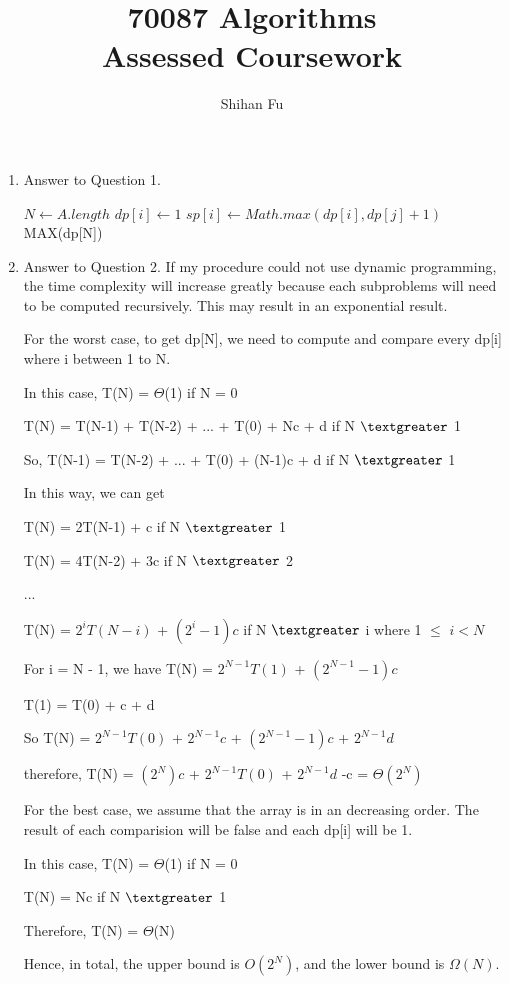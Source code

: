 \documentclass{article}
\title{
  70087 Algorithms \\
  Assessed Coursework
}
\author{Shihan Fu}
\begin{document}
\maketitle

\begin{enumerate}
  \item Answer to Question 1.
    \begin{algorithmic}[1]
      \Statex
        \State $N \gets A.length$
          \State $dp[i] \gets 1$
        \EndFor
              \State $sp[i] \gets Math.max(dp[i],dp[j]+1)$
            \EndIf
          \EndFor
        \EndFor
        \State \Return MAX(dp[N])
      \EndProcedure
    \end{algorithmic}
  \item Answer to Question 2.
  If my procedure could not use dynamic programming, the time complexity will increase greatly because each subproblems will need to be computed recursively. This may result in an exponential result.
  
  For the worst case, to get dp[N],  we need to compute and compare every dp[i] where i between 1 to N.
  
  In this case, T(N) = $\Theta$(1)  if N = 0
  
  T(N) = T(N-1) + T(N-2) + ... + T(0) + Nc + d    if N $\textgreater$ 1
  
  So, T(N-1) = T(N-2) + ... + T(0) + (N-1)c + d   if N $\textgreater$ 1
  
  In this way, we can get
  
  T(N) = 2T(N-1) + c    if N $\textgreater$ 1
  
  T(N) = 4T(N-2) + 3c   if N $\textgreater$ 2
  
  ...
  
  T(N) = $2^iT(N-i)$ + $(2^i -1)c$  if N $\textgreater$ i where 1 $\leq$ $i < N$
  
  For i = N - 1, we have T(N) = $2^{N-1}T(1)$ + $(2^{N-1} -1)c$
  
  T(1) = T(0) + c + d
  
  So T(N) = $2^{N-1}T(0)$ + $2^{N-1}c$ + $(2^{N-1}-1)c$ + $2^{N-1}d$
  
  therefore, T(N) = $(2^N)c$ + $2^{N-1}T(0)$ + $2^{N-1}d$ -c = $\Theta$$(2^N)$
  
  For the best case, we assume that the array is in an decreasing order. 
  The result of each comparision will be false and each dp[i] will be 1.
  
  In this case, T(N) = $\Theta$(1)  if N = 0
  
  T(N) = Nc     if N $\textgreater$ 1
  
  Therefore, T(N) = $\Theta$(N)
  
  Hence, in total, the upper bound is $O(2^N)$, and the lower bound is $\Omega(N)$.


\end{enumerate}
\end{document}
